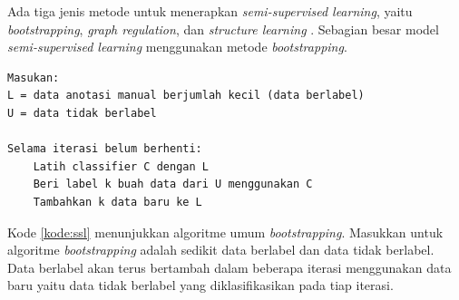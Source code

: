 Ada tiga jenis metode untuk menerapkan \textit{semi-supervised learning}, yaitu \textit{bootstrapping}, \textit{graph regulation}, dan \textit{structure learning} \citep{blitzer2008semi}. Sebagian besar model \textit{semi-supervised learning} menggunakan metode \textit{bootstrapping}. 
\begin{lstlisting}[caption={Algoritme \textit{bootstrapping}}, label={kode:ssl}]
Masukan:
L = data anotasi manual berjumlah kecil (data berlabel)
U = data tidak berlabel

Selama iterasi belum berhenti:	
	Latih classifier C dengan L
	Beri label k buah data dari U menggunakan C
	Tambahkan k data baru ke L
\end{lstlisting}
Kode \ref{kode:ssl} menunjukkan algoritme umum \textit{bootstrapping}. Masukkan untuk algoritme \textit{bootstrapping} adalah sedikit data berlabel dan data tidak berlabel. Data berlabel akan terus bertambah dalam beberapa iterasi menggunakan data baru yaitu data tidak berlabel yang diklasifikasikan pada tiap iterasi.

